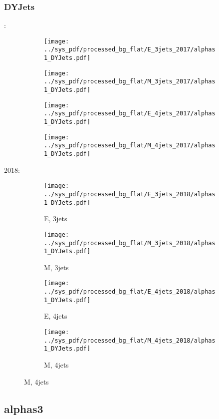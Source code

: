 \documentclass{beamer}
\begin{document}
\begin{frame}
\frametitle{DYJets}
\fontsize{5}{1}:
\begin{figure}
\centering
\begin{subfigure}[b]{0.24\textwidth}
\texttt{[image: ../sys\_pdf/processed\_bg\_flat/E\_3jets\_2017/alphas1\_DYJets.pdf]}
\end{subfigure}
\begin{subfigure}[b]{0.24\textwidth}
\texttt{[image: ../sys\_pdf/processed\_bg\_flat/M\_3jets\_2017/alphas1\_DYJets.pdf]}
\end{subfigure}
\begin{subfigure}[b]{0.24\textwidth}
\texttt{[image: ../sys\_pdf/processed\_bg\_flat/E\_4jets\_2017/alphas1\_DYJets.pdf]}
\end{subfigure}
\begin{subfigure}[b]{0.24\textwidth}
\texttt{[image: ../sys\_pdf/processed\_bg\_flat/M\_4jets\_2017/alphas1\_DYJets.pdf]}
\end{subfigure}
\end{figure}
2018:
\begin{figure}
\centering
\begin{subfigure}[b]{0.24\textwidth}
\texttt{[image: ../sys\_pdf/processed\_bg\_flat/E\_3jets\_2018/alphas1\_DYJets.pdf]}
\captionsetup{font=tiny}
\caption{E, 3jets}
\end{subfigure}
\begin{subfigure}[b]{0.24\textwidth}
\texttt{[image: ../sys\_pdf/processed\_bg\_flat/M\_3jets\_2018/alphas1\_DYJets.pdf]}
\captionsetup{font=tiny}
\caption{M, 3jets}
\end{subfigure}
\begin{subfigure}[b]{0.24\textwidth}
\texttt{[image: ../sys\_pdf/processed\_bg\_flat/E\_4jets\_2018/alphas1\_DYJets.pdf]}
\captionsetup{font=tiny}
\caption{E, 4jets}
\end{subfigure}
\begin{subfigure}[b]{0.24\textwidth}
\texttt{[image: ../sys\_pdf/processed\_bg\_flat/M\_4jets\_2018/alphas1\_DYJets.pdf]}
\captionsetup{font=tiny}
\caption{M, 4jets}
\end{subfigure}
\end{figure}
\end{frame}


\subsection{alphas3}
\end{document}
